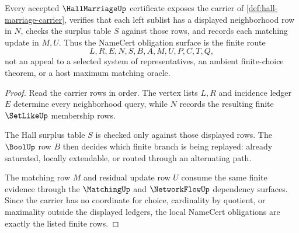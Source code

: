 \begin{theorem}
\label{thm:hall-marriage-namecert-obligations}
Every accepted $\HallMarriageUp$ certificate exposes the carrier of \autoref{def:hall-marriage-carrier}, verifies that each left sublist has a displayed neighborhood row in $N$, checks the surplus table $S$ against those rows, and records each matching update in $M,U$. Thus the NameCert obligation surface is the finite route
$$
L,R,E,N,S,B,A,M,U,P,C,T,Q,
$$
not an appeal to a selected system of representatives, an ambient finite-choice theorem, or a host maximum matching oracle.
\end{theorem}
\begin{proof}
Read the carrier rows in order. The vertex lists $L,R$ and incidence ledger $E$ determine every neighborhood query, while $N$ records the resulting finite $\SetLikeUp$ membership rows.

The Hall surplus table $S$ is checked only against those displayed rows. The $\BoolUp$ row $B$ then decides which finite branch is being replayed: already saturated, locally extendable, or routed through an alternating path.

The matching row $M$ and residual update row $U$ consume the same finite evidence through the $\MatchingUp$ and $\NetworkFlowUp$ dependency surfaces. Since the carrier has no coordinate for choice, cardinality by quotient, or maximality outside the displayed ledgers, the local NameCert obligations are exactly the listed finite rows.
\end{proof}

